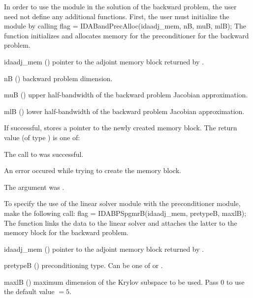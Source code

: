 In order to use the {\idabandpre} module in the solution of the backward problem,
the user need not define any additional functions. First, the user must initialize the
{\idabandpre} module by calling
{
  flag = IDABandPrecAlloc(idaadj\_mem, nB, muB, mlB);
}
{
  The function  initializes and allocates
  memory for the {\idabandpre} preconditioner for the backward problem.
}
{
  \begin{args}
  \item[idaadj\_mem] ()
    pointer to the adjoint memory block returned by .
  \item[nB] ()
    backward problem dimension.
  \item[muB] ()
    upper half-bandwidth of the backward problem Jacobian approximation.
  \item[mlB] ()
    lower half-bandwidth of the backward problem Jacobian approximation.
  \end{args}
}
{
  If successful,  stores a pointer to the newly created 
  {\idabandpre} memory block.
  The return value  (of type ) is one of:
  \begin{args}
  \item[\Id{IDABANDPRE\_SUCCESS}]
    The call to  was successful.
  \item[\Id{IDABANDPRE\_MEM\_FAIL}]
    An error occured while trying to create the {\idabandpre} memory block.
  \item[\Id{IDABANDPRE\_ADJMEM\_NULL}]
    The  argument was .
  \end{args}
}
{}
To specify the use of the {\idaspgmr} linear solver module with the {\idabandpre} 
preconditioner module, make the following call:
{
  flag = IDABPSpgmrB(idaadj\_mem, pretypeB, maxlB);
}
{
  The function  links the {\idabandpre} data to the
  {\idaspgmr} linear solver and attaches the latter to the {\idas}
  memory block for the backward problem.
}
{
  \begin{args}
  \item[idaadj\_mem] ()
    pointer to the adjoint memory block returned by .
  \item[pretypeB] ()
    preconditioning type. Can be one of  or .
  \item[maxlB] ()
    maximum dimension of the Krylov subspace to be used. Pass $0$ to use the 
    default value $=5$.
  \end{args}
}
